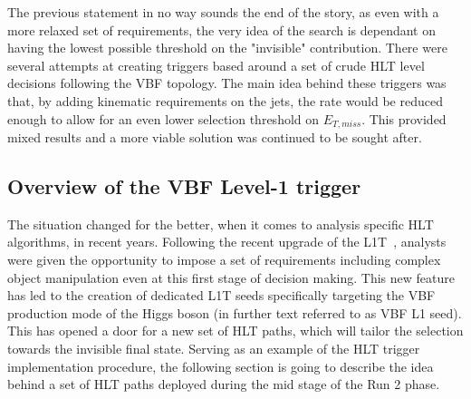 \hspace{10pt} The previous statement in no way sounds the end of the story, as even with a more relaxed set of requirements, the very idea of the search is dependant on having the lowest possible threshold on the "invisible" contribution. There were several attempts at creating triggers based around a set of crude HLT level decisions following the VBF topology. The main idea behind these triggers was that, by adding kinematic requirements on the jets, the rate would be reduced enough to allow for an even lower selection threshold on $E_{T,miss}$. This provided mixed results and a more viable solution was continued to be sought after.


\subsection{Overview of the VBF Level-1 trigger}
\label{l1:vbf}
\hspace{10pt} The situation changed for the better, when it comes to analysis specific HLT algorithms, in recent years. Following the recent upgrade of the L1T~\cite{cms:l1_paper}, analysts were given the opportunity to impose a set of requirements including complex object manipulation even at this first stage of decision making. This new feature has led to the creation of dedicated L1T seeds specifically targeting the VBF production mode of the Higgs boson (in further text referred to as VBF L1 seed). This has opened a door for a new set of HLT paths, which will tailor the selection towards the invisible final state. Serving as an example of the HLT trigger implementation procedure, the following section is going to describe the idea behind a set of HLT paths deployed during the mid stage of the Run 2 phase.

